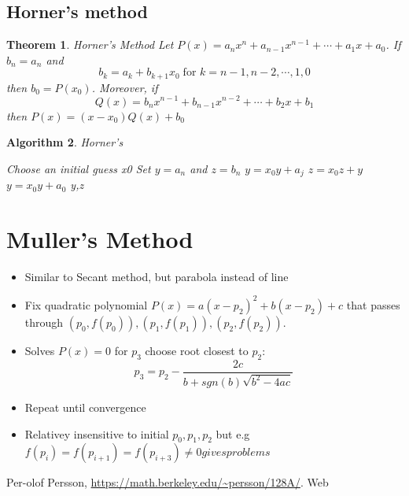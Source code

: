 \documentclass[12pt]{article}
\newtheorem{theorem}{Theorem}[subsection]
\newtheorem{alg}[theorem]{Algorithm}
\begin{document}
\subsection{Horner's method}
\begin{theorem} {Horner's Method}
\newline Let $P(x) = a_nx^n +a_{n-1}x^{n-1} + \cdots +a_1x + a_0$. If $b_n = a_n$ and $$b_k = a_k +b_{k+1}x_0 \; \text{for $k = n-1, n-2, \cdots, 1,0$}$$
then $b_0 = P(x_0)$. Moreover, if 
$$ Q(x) = b_nx^{n-1} + b_{n-1}x^{n-2} + \cdots + b_2x + b_1$$
then $P(x) = (x - x_0)Q(x) + b_0$
\end{theorem}

\begin{alg}{Horner's }
	\begin{algorithmic}
	Choose an initial guess x0
	\State Set $y = a_n$ and $z = b_n$
	\State $y = x_0y + a_j$
	\State $z = x_0z + y$
	\EndFor	
	\State $y = x_0y + a_0$
	\State \Return y,z
	\end{algorithmic}
	
\end{alg}


\section{Muller's Method}
\begin{itemize}
	\item Similar to Secant method, but parabola instead of line
	\item Fix quadratic polynomial $P(x) = a(x-p_2)^2 +b(x - p_2) + c$ that passes through $(p_0,f(p_0)),(p_1,f(p_1)),(p_2,f(p_2))$.
	\item Solves $P(x) = 0$ for $p_3$ choose root closest to $p_2$:
	$$p_3 = p_2 - \frac{2c}{b + sgn(b)\sqrt{b^2 - 4ac}}$$
	\item Repeat until convergence
	\item Relativey insensitive to initial $p_0,p_1,p_2$ but e.g $f(p_i) = f(p_{i+1}) = f(p_{i+3}) \neq 0 gives problems$
\end{itemize}
 \newpage
 \begin{thebibliography}{1}

      Per-olof Persson, \url{https://math.berkeley.edu/~persson/128A/}. Web

  \end{thebibliography}
\end{document}
